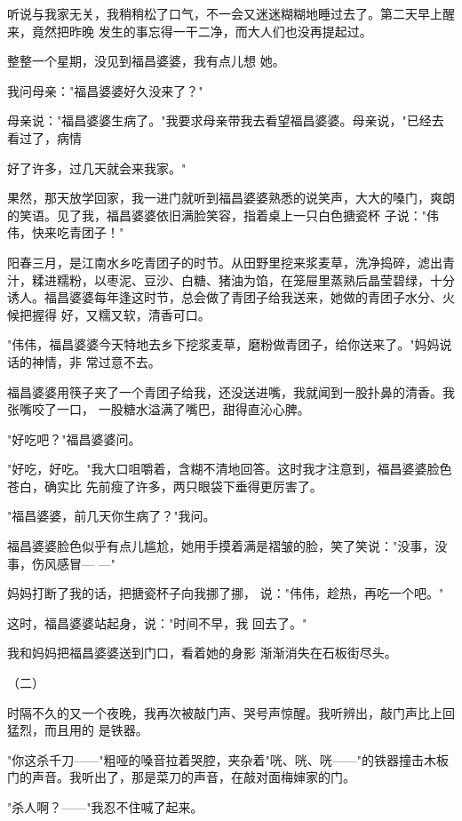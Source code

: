 \documentclass{article}
\begin{document}
听说与我家无关，我稍稍松了口气，不一会又迷迷糊糊地睡过去了。第二天早上醒来，竟然把昨晚
发生的事忘得一干二净，而大人们也没再提起过。 

整整一个星期，没见到福昌婆婆，我有点儿想
她。 


我问母亲："福昌婆婆好久没来了？" 

母亲说："福昌婆婆生病了。"我要求母亲带我去看望福昌婆婆。母亲说，"已经去看过了，病情

\newpage
好了许多，过几天就会来我家。" 

果然，那天放学回家，我一进门就听到福昌婆婆熟悉的说笑声，大大的嗓门，爽朗的笑语。见了我，福昌婆婆依旧满脸笑容，指着桌上一只白色搪瓷杯
子说："伟伟，快来吃青团子！" 

阳春三月，是江南水乡吃青团子的时节。从田野里挖来浆麦草，洗净捣碎，滤出青汁，糅进糯粉，以枣泥、豆沙、白糖、猪油为馅，在笼屉里蒸熟后晶莹碧绿，十分诱人。福昌婆婆每年逢这时节，总会做了青团子给我送来，她做的青团子水分、火候把握得
好，又糯又软，清香可口。 

"伟伟，福昌婆婆今天特地去乡下挖浆麦草，磨粉做青团子，给你送来了。"妈妈说话的神情，非
常过意不去。 

福昌婆婆用筷子夹了一个青团子给我，还没送进嘴，我就闻到一股扑鼻的清香。我张嘴咬了一口，
一股糖水溢满了嘴巴，甜得直沁心脾。 

\newpage


"好吃吧？"福昌婆婆问。 

"好吃，好吃。"我大口咀嚼着，含糊不清地回答。这时我才注意到，福昌婆婆脸色苍白，确实比
先前瘦了许多，两只眼袋下垂得更厉害了。 


"福昌婆婆，前几天你生病了？"我问。 

福昌婆婆脸色似乎有点儿尴尬，她用手摸着满是褶皱的脸，笑了笑说："没事，没事，伤风感冒—
—" 

妈妈打断了我的话，把搪瓷杯子向我挪了挪，
说："伟伟，趁热，再吃一个吧。" 

这时，福昌婆婆站起身，说："时间不早，我
回去了。" 

我和妈妈把福昌婆婆送到门口，看着她的身影
渐渐消失在石板街尽头。 

\newpage


（二） 

时隔不久的又一个夜晚，我再次被敲门声、哭号声惊醒。我听辨出，敲门声比上回猛烈，而且用的
是铁器。 

"你这杀千刀——"粗哑的嗓音拉着哭腔，夹杂着"咣、咣、咣——"的铁器撞击木板门的声音。我听出了，那是菜刀的声音，在敲对面梅婶家的门。


"杀人啊？——"我忍不住喊了起来。 
\end{document}
